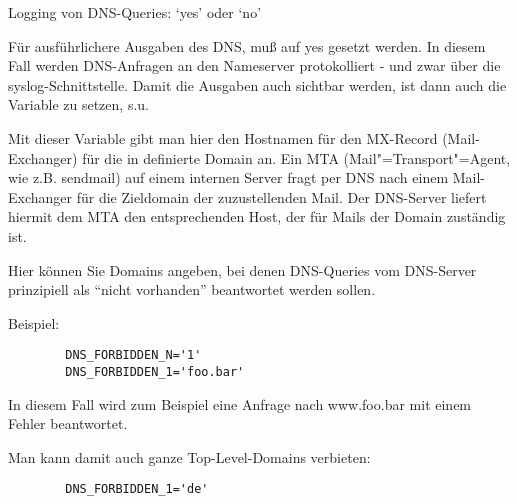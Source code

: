\begin{description}

    { Logging von DNS-Queries: `yes' oder `no'

      Für ausführlichere Ausgaben des DNS, muß  auf yes
      gesetzt werden.  In diesem Fall werden DNS-Anfragen
      an den Nameserver protokolliert - und zwar über die
      syslog-Schnittstelle. Damit die Ausgaben auch sichtbar werden,
      ist dann auch die Variable 
          zu setzen, s.u.}



      {Mit dieser Variable gibt man hier den Hostnamen für den MX-Record
      (Mail-Exchanger) für die in  definierte Domain an.
      Ein MTA (Mail"=Transport"=Agent, wie z.B. sendmail)
      auf einem internen Server fragt per DNS nach einem Mail-Exchanger
      für die Zieldomain der zuzustellenden Mail. Der DNS-Server liefert
      hiermit dem MTA den entsprechenden Host, der für Mails der Domain
       zuständig ist.

      }



    {Hier können Sie Domains angeben, bei denen DNS-Queries vom
      DNS-Server prinzipiell als ``nicht vorhanden'' beantwortet
      werden sollen.

      Beispiel:

\begin{example}
\begin{verbatim}
        DNS_FORBIDDEN_N='1'
        DNS_FORBIDDEN_1='foo.bar'
\end{verbatim}
\end{example}

      In diesem Fall wird zum Beispiel eine Anfrage nach www.foo.bar
      mit einem Fehler beantwortet.

      Man kann damit auch ganze Top-Level-Domains verbieten:

\begin{example}
\begin{verbatim}
        DNS_FORBIDDEN_1='de'
\end{verbatim}
\end{example}

}
\end{description}
